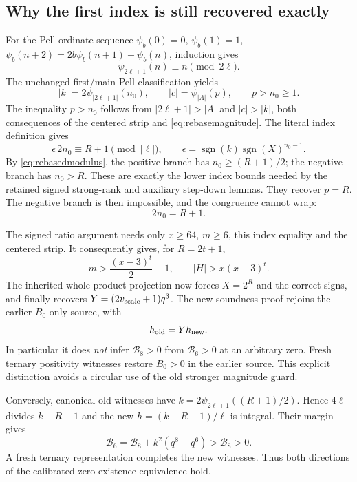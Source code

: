 \subsection{Why the first index is still recovered exactly}
For the Pell ordinate sequence
$\psi_b(0)=0$, $\psi_b(1)=1$,
$\psi_b(n+2)=2b\psi_b(n+1)-\psi_b(n)$, induction gives
\[
 \psi_{2\ell+1}(n)\equiv n\pmod{2\ell}.
\]
The unchanged first/main Pell classification yields
\[
 |k|=2\psi_{|2\ell+1|}(n_0),\qquad
 |c|=\psi_{|A|}(p),\qquad p>n_0\ge1.
\]
The inequality $p>n_0$ follows from $|2\ell+1|>|A|$ and
$|c|>|k|$, both consequences of the centered strip and
\eqref{eq:rebasemagnitude}. The literal index definition gives
\[
 \epsilon\,2n_0\equiv R+1\pmod{|\ell|},\qquad
 \epsilon=\operatorname{sgn}(k)\operatorname{sgn}(X)^{n_0-1}.
\]
By \eqref{eq:rebasedmodulus}, the positive branch has
$n_0\ge(R+1)/2$; the negative branch has $n_0>R$.
These are exactly the lower index bounds needed by the retained signed
strong-rank and auxiliary step-down lemmas. They recover $p=R$.
The negative branch is then impossible, and the congruence cannot wrap:
\[
 2n_0=R+1.
\]

The signed ratio argument needs only $x\ge64$, $m\ge6$, this index
equality and the centered strip. It consequently gives, for $R=2t+1$,
\[
 m>\frac{(x-3)^t}{2}-1,\qquad |H|>x(x-3)^t.
\]
The inherited whole-product projection now forces
$X=2^R$ and the correct signs, and finally recovers
$Y=(2v_{\rm scale}+1)q^3$. The new soundness proof rejoins the earlier
$B_0$-only source, with
\[
 h_{\rm old}=Yh_{\rm new}.
\]
In particular it does \emph{not} infer $\mathcal B_8>0$ from
$\mathcal B_6>0$ at an arbitrary zero. Fresh ternary positivity witnesses
restore $B_0>0$ in the earlier source. This explicit distinction avoids a
circular use of the old stronger magnitude guard.

Conversely, canonical old witnesses have
$k=2\psi_{2\ell+1}((R+1)/2)$. Hence $4\ell$ divides $k-R-1$ and the
new $h=(k-R-1)/\ell$ is integral. Their margin gives
\[
 \mathcal B_6=\mathcal B_8+k^2(q^8-q^6)>\mathcal B_8>0.
\]
A fresh ternary representation completes the new witnesses. Thus both
directions of the calibrated zero-existence equivalence hold.

